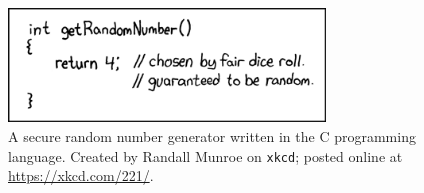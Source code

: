 \begin{figure}[t]
\centering
    \includegraphics[width=0.75\textwidth]{figures/xkcd/xkcd_221_random_number.png}
    \caption[\texttt{xkcd} RNG]{A secure random number generator
        written in the C programming language.
        Created by Randall Munroe on \texttt{xkcd};
        posted online at \url{https://xkcd.com/221/}.
        }
    \label{fig:xkcd_rng}
\end{figure}
